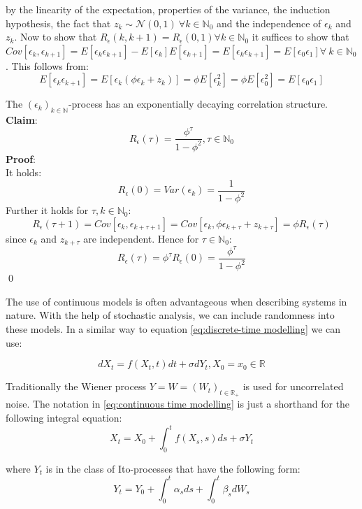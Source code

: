 \documentclass[%
thesis=student,%
coverpage=false,%
titlepage=false,%
headmarks=true, %
english,%
font=libertine, %
math=newpxtx, %
BCOR=5mm,%
coverBCOR=11mm%
]{tumbook}
\begin{document}
by the linearity of the expectation, properties of the variance, the induction hypothesis, the fact that $z_{k} \sim \mathcal{N}(0,1) \ \forall k \in \mathbb{N}_{0}$ and the independence of $\epsilon_{k}$ and $z_{k}$. Now to show that $R_{\epsilon}(k,k+1) = R_{\epsilon}(0,1) \forall k \in \mathbb{N}_{0}$ it suffices to show that $Cov[\epsilon_{k},\epsilon_{k+1}] = E[\epsilon_{k}\epsilon_{k+1}] - E[\epsilon_{k}]E[\epsilon_{k+1}] = E[\epsilon_{k}\epsilon_{k+1}] = E[\epsilon_{0}\epsilon_{1}] \forall \ k \in \mathbb{N}_{0}$. This follows from: 
\[
E[\epsilon_{k}\epsilon_{k+1}] = E[\epsilon_{k}(\phi\epsilon_{k} + z_{k})] = \phi E[\epsilon_{k}^2] = \phi E[\epsilon_{0}^2] = E[\epsilon_{0}\epsilon_{1}]
\]

The $(\epsilon_{k})_{k \in \mathbb{N}}$-process has an exponentially decaying correlation structure. \textbf{Claim}:
\[
R_{\epsilon}(\tau) = \frac{\phi^{\tau}}{1-\phi^{2}}, \tau \in \mathbb{N}_{0}
\]
\textbf{Proof}: \\
It holds: 
\[
R_{\epsilon}(0)= Var(\epsilon_{k}) = \frac{1}{1-\phi^{2}}
\]
Further it holds for $\tau, k \in \mathbb{N}_{0}$:
\[
R_{\epsilon}(\tau+1) = Cov[\epsilon_{k},\epsilon_{k+\tau + 1}] = Cov[\epsilon_{k},\phi\epsilon_{k+\tau}+z_{k+\tau}] = \phi R_{\epsilon}(\tau)
\]
since $\epsilon_{k}$ and $z_{k+\tau}$ are independent. Hence for $\tau \in \mathbb{N}_{0}$:
\[
R_{\epsilon}(\tau) = \phi^{\tau}R_{\epsilon}(0)=\frac{\phi^{\tau}}{1-\phi^{2}}
\]
\qed

The use of continuous models is often advantageous when describing systems in nature. With the help of stochastic analysis, we can include randomness into these models. In a similar way to equation \ref{eq:discrete-time modelling} we can use: 

\begin{equation}
    dX_{t} = f(X_{t},t)dt + \sigma dY_{t}, X_{0} = x_{0} \in \mathbb{R}
    \label{eq:continuous time modelling}
\end{equation}

Traditionally the Wiener process $Y = W = (W_{t})_{t\in \mathbb{R}_{+}}$ is used for uncorrelated noise. The notation in \ref{eq:continuous time modelling} is just a shorthand for the following integral equation:
\[
X_{t} = X_{0} + \int_{0}^{t}f(X_{s},s)ds + \sigma Y_{t}
\]

where $Y_{t}$ is in the class of Ito-processes that have the following form:
\begin{equation}
    Y_{t} = Y_{0} + \int_{0}^{t}\alpha_{s}ds + \int_{0}^{t}\beta_{s}dW_{s}
    \label{eq:Ito process}
\end{equation}
\end{document}

